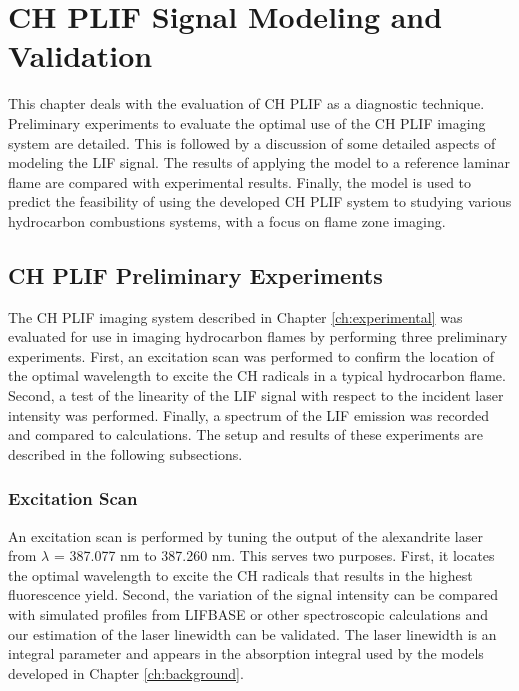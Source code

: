 \chapter{CH PLIF Signal Modeling and Validation}
\label{ch:chplif}

This chapter deals with the evaluation of CH PLIF as a diagnostic technique.
Preliminary experiments to evaluate the optimal use of the CH PLIF imaging system are detailed.
This is followed by a discussion of some detailed aspects of modeling the LIF signal.
The results of applying the model to a reference laminar flame are compared with experimental results.
Finally, the model is used to predict the feasibility of using the developed CH PLIF system to studying various hydrocarbon combustions systems, with a focus on flame zone imaging.

\section{CH PLIF Preliminary Experiments}
\label{sec:chplif-preliminary-experiments}

The CH PLIF imaging system described in Chapter \ref{ch:experimental} was evaluated for use in imaging hydrocarbon flames by performing three preliminary experiments.
First, an excitation scan was performed to confirm the location of the optimal wavelength to excite the CH radicals in a typical hydrocarbon flame.
Second, a test of the linearity of the LIF signal with respect to the incident laser intensity was performed.
Finally, a spectrum of the LIF emission was recorded and compared to calculations.
The setup and results of these experiments are described in the following subsections.

\subsection{Excitation Scan}
\label{subsec:prelim-excitation-scan}

An excitation scan is performed by tuning the output of the alexandrite laser from \(\lambda\) = 387.077 nm to 387.260 nm.
This serves two purposes.
First, it locates the optimal wavelength to excite the CH radicals that results in the highest fluorescence yield.
Second, the variation of the signal intensity can be compared with simulated profiles from LIFBASE\cite{1999-luque-a} or other spectroscopic calculations and our estimation of the laser linewidth can be validated.
The laser linewidth is an integral parameter and appears in the absorption integral used by the models developed in Chapter \ref{ch:background}.

